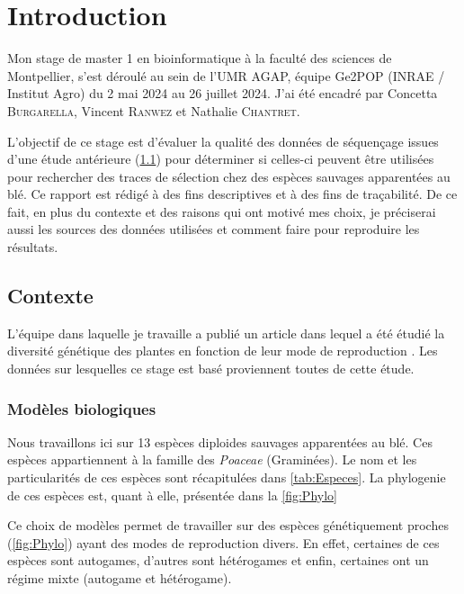 \documentclass[../main]{subfiles} %
\begin{document}
\addto\extrasfrench{\protected\edef:{\unexpanded\expandafter{:}}}



\section{Introduction}

Mon stage de master 1 en bioinformatique à la faculté des sciences de Montpellier, s’est déroulé au sein de 
l’UMR AGAP, équipe Ge2POP (INRAE / Institut Agro) du 2 mai 2024 au 26 juillet 2024. J’ai été encadré par Concetta \textsc{Burgarella}, Vincent \textsc{Ranwez} et Nathalie \textsc{Chantret}. 

L’objectif de ce stage est d’évaluer la qualité des données de \gls{séquençage} issues d’une étude antérieure (\cref{Contexte}) pour déterminer si celles-ci peuvent être utilisées pour rechercher des traces de sélection chez des espèces sauvages apparentées au blé.  Ce rapport est rédigé à des fins descriptives et à des fins de traçabilité. De ce fait,  en plus du contexte et des raisons qui ont motivé mes choix, je préciserai aussi les sources des données utilisées et comment faire pour reproduire les résultats.

\subsection{Contexte}
\label{Contexte}
L’équipe dans laquelle je travaille a publié un article dans lequel a été étudié la diversité génétique des plantes en fonction de leur mode de reproduction \cite{burgarella_mating_2024}. Les données sur lesquelles ce stage est basé proviennent toutes de cette étude.

\subsubsection{Modèles biologiques}
\label{model_bio}
Nous travaillons ici sur 13 espèces \glspl{diploide} sauvages apparentées au blé. Ces espèces appartiennent à la famille des \textit{Poaceae} (Graminées). Le nom et les particularités de ces espèces sont récapitulées dans \cref{tab:Especes}. La \gls{phylogenie} de ces espèces est, quant à elle, présentée dans la \cref{fig:Phylo}




Ce choix de modèles permet de travailler sur des espèces génétiquement proches (\cref{fig:Phylo}) ayant des modes de reproduction divers. En effet, certaines de ces espèces sont \glspl{autogame}, d’autres sont \glspl{hétérogame} et enfin, certaines ont un régime mixte (\gls{autogame} et \gls{hétérogame}).
\end{document}
